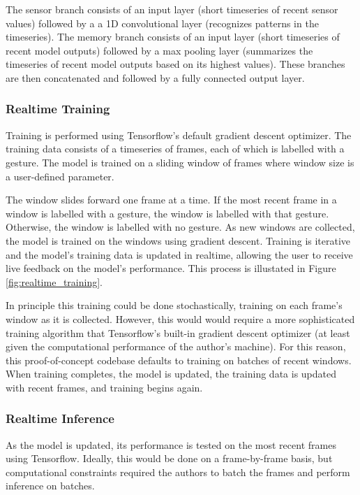 \documentclass{article}
\begin{document}
The sensor branch consists of an input layer (short timeseries of recent sensor values) followed by a  a 1D convolutional layer (recognizes patterns in the timeseries). The memory branch consists of an input layer (short timeseries of recent model outputs) followed by a max pooling layer (summarizes the timeseries of recent model outputs based on its highest values). These branches are then concatenated and followed by a fully connected output layer. 




\subsubsection{Realtime Training}
Training is performed using Tensorflow's default gradient descent optimizer. The training data consists of a timeseries of frames, each of which is labelled with a gesture. The model is trained on a sliding window of frames where window size is a user-defined parameter.

The window slides forward one frame at a time. If the most recent frame in a window is labelled with a gesture, the window is labelled with that gesture. Otherwise, the window is labelled with no gesture. As new windows are collected, the model is trained on the windows using gradient descent. Training is iterative and the model's training data is updated in realtime, allowing the user to receive live feedback on the model's performance. This process is illustated in Figure \ref{fig:realtime_training}.

In principle this training could be done stochastically, training on each frame's window as it is collected. However, this would  would require a more sophisticated training algorithm that Tensorflow's built-in gradient descent optimizer (at least given the computational performance of the author's machine). For this reason, this proof-of-concept codebase defaults to training on batches of recent windows. When training completes, the model is updated, the training data is updated with recent frames, and training begins again.

\subsubsection{Realtime Inference}
As the model is updated, its performance is tested on the most recent frames using Tensorflow. Ideally, this would be done on a frame-by-frame basis, but computational constraints required the authors to batch the frames and perform inference on batches.
\end{document}
